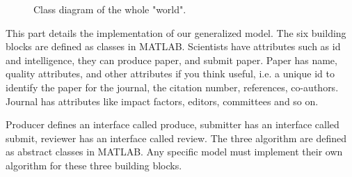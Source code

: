 \documentclass[11pt]{article}
\begin{document}
\begin{figure}[!th]
\caption{Class diagram of the whole "world".}
\label{fig:cd}
\end{figure}

This part details the implementation of our generalized model. The six building blocks are defined as classes in MATLAB. Scientists have attributes such as id and intelligence, they can produce paper, and submit paper. Paper has name, quality attributes, and other attributes if you think useful, i.e. a unique id to identify the paper for the journal, the citation number, references, co-authors. Journal has attributes like impact factors, editors, committees and so on.

Producer defines an interface called produce, submitter has an interface called submit, reviewer has an interface called review. The three algorithm are defined as abstract classes in MATLAB. Any specific model must implement their own algorithm for these three building blocks.
\end{document}
